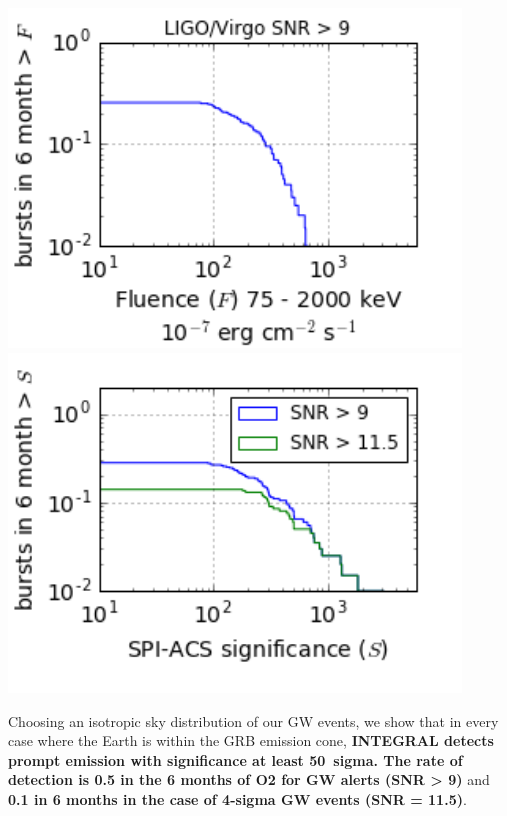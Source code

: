 \documentclass[a0,portrait]{a0poster}
\renewcommand{\emph}[1]{\textbf{\color{blue}#1}}
\begin{document}
\begin{multicols}{2}
\begin{center}
    \includegraphics[height=9cm]{figures/fluence_distribution_9.png}
    \includegraphics[height=9cm]{figures/significance_distribution_9_11_5.png}
  \vspace*{-0.7cm}
    \label{covered_region}
\end{center}

Choosing an isotropic sky distribution of our GW events, we show that
in every case where the Earth is within the GRB emission cone,
\emph{INTEGRAL detects prompt emission with significance at least 50~sigma.
The rate of detection is 0.5 in the 6 months of O2 for GW alerts (SNR > 9)} 
and \emph{0.1 in 6 months  in the case of 4-sigma GW events (SNR = 11.5)}.


\end{multicols}
\end{document}
